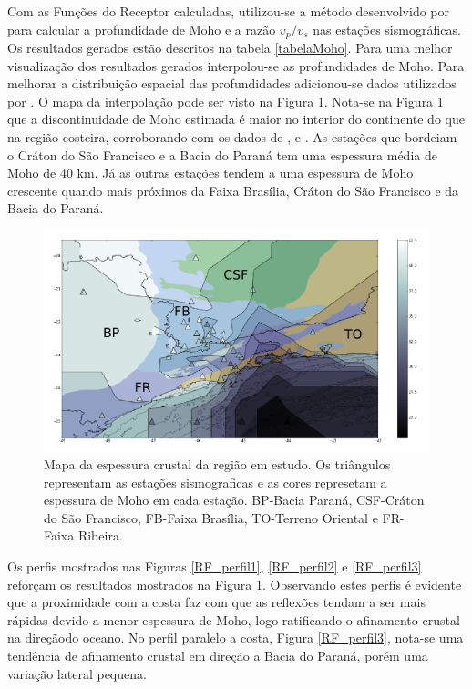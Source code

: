 Com as Funções do Receptor calculadas, utilizou-se a método desenvolvido por \cite{Zhu_Kanamori_2000} para calcular a profundidade de Moho e a razão $v_{p}/v_{s}$ nas estações sismográficas. Os resultados gerados estão descritos na tabela \ref{tabelaMoho}. Para uma melhor visualização dos resultados gerados interpolou-se as profundidades de Moho. Para melhorar a distribuição espacial das profundidades adicionou-se dados utilizados por \cite{Assumpcao_Brazil_2013}. O mapa da interpolação pode ser visto na Figura \ref{Interpolacao}. Nota-se na Figura \ref{Interpolacao} que a discontinuidade de Moho estimada é maior no interior do continente do que na região costeira, corroborando com os dados de \cite{Assumpcao_America_2013}, \citep{Assumpcao_Brazil_2013} e \cite{van_der_meijde_gravity_2013}. As estações que bordeiam o Cráton do São Francisco e a Bacia do Paraná tem uma espessura média de Moho de 40 km. Já as outras estações tendem a uma espessura de Moho crescente quando mais próximos da Faixa Brasília, Cráton do São Francisco e da Bacia do Paraná.

\begin{figure}[!ht]
\centering
\includegraphics[scale=0.5]{Figs/Interpolacao_Linear.png}
\caption[Mapa da espessura crustal da região em estudo.]{Mapa da espessura crustal da região em estudo. Os triângulos representam as estações sismograficas e as cores represetam a espessura de Moho em cada estação. BP-Bacia Paraná, CSF-Cráton do São Francisco, FB-Faixa Brasília, TO-Terreno Oriental  e FR-Faixa Ribeira.}
\label{Interpolacao}
\end{figure}

Os perfis mostrados nas Figuras \ref{RF_perfil1}, \ref{RF_perfil2} e \ref{RF_perfil3} reforçam  os resultados mostrados na Figura \ref{Interpolacao}. Observando estes perfis é evidente que a proximidade com a costa  faz com que as reflexões tendam a ser mais rápidas devido a menor espessura de Moho, logo ratificando o afinamento crustal na direçãodo oceano. No perfil paralelo a costa, Figura \ref{RF_perfil3}, nota-se uma tendência de afinamento crustal em direção a Bacia do Paraná, porém uma variação lateral pequena. 

